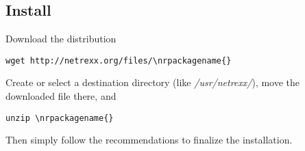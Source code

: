 \subsection{Install \nr{}}
Download the \nr{} distribution
\begin{verbatim}
wget http://netrexx.org/files/\nrpackagename{}
\end{verbatim}
Create or select a destination directory (like \emph{/usr/netrexx/}), move the downloaded file there, and
\begin{verbatim}
unzip \nrpackagename{}
\end{verbatim}
Then simply follow the \nr{} recommendations to finalize the installation.


